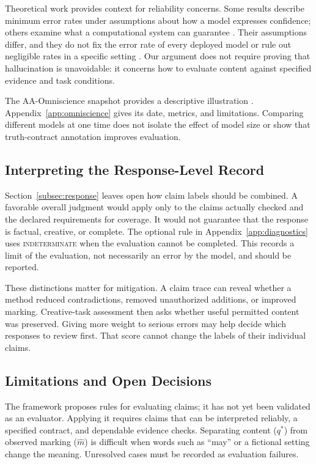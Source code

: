 \documentclass{clv2025}
\begin{document}
Theoretical work provides context for reliability concerns. Some results
describe minimum error rates under assumptions about how a model expresses
confidence; others examine what a computational system can guarantee
\citep{kalai_calibrated_2024,xu_hallucination_2024,banerjee_llms_2024}.
Their assumptions differ, and they do not fix the error rate of every
deployed model or rule out negligible rates in a specific setting
\citep{suzuki_negligible_2025}. Our argument does not require proving that
hallucination is unavoidable: it concerns how to evaluate content against
specified evidence and task conditions.

The AA-Omniscience snapshot provides a descriptive
illustration \citep{jackson_aaomniscience_2025,artificialanalysis_omniscience_leaderboard_2026}.
Appendix~\ref{app:omniscience} gives its date, metrics, and limitations.
Comparing different models at one time does not isolate the effect of model
size or show that truth-contract annotation improves evaluation.

\subsection{Interpreting the Response-Level Record}

Section~\ref{subsec:response} leaves open how claim labels should be combined.
A favorable overall judgment would apply only to the claims actually checked
and the declared requirements for coverage. It would not guarantee that the
response is factual, creative, or complete. The optional rule in
Appendix~\ref{app:diagnostics} uses \textsc{indeterminate} when the evaluation
cannot be completed. This records a limit of the evaluation, not necessarily
an error by the model, and should be reported.

These distinctions matter for mitigation. A claim trace can reveal whether a
method reduced contradictions, removed unauthorized additions, or improved
marking. Creative-task assessment then asks whether useful permitted content
was preserved. Giving more weight to serious errors may help decide which
responses to review first. That score cannot change the labels of their
individual claims.

\subsection{Limitations and Open Decisions}

The framework proposes rules for evaluating claims; it has not yet been
validated as an evaluator. Applying it requires claims that can be interpreted
reliably, a specified contract, and dependable evidence checks. Separating
content ($q^*$) from observed marking ($\widehat{m}$) is difficult when words
such as ``may'' or a fictional setting change the meaning. Unresolved cases
must be recorded as evaluation failures.
\end{document}
